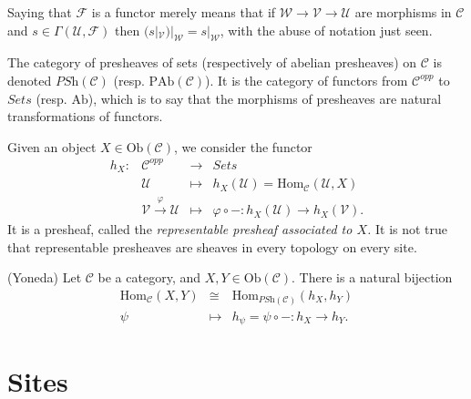 \medskip\noindent
Saying that $\mathcal{F}$ is a functor merely means that if $\mathcal{W} \to 
\mathcal{V} \to \mathcal{U}$ are morphisms in $\mathcal{C}$ and $s \in 
\Gamma(\mathcal{U},\mathcal{F})$ then
$(s|_\mathcal{V})|_\mathcal{W} = s |_\mathcal{W}$, with the abuse of
notation just seen.

\medskip\noindent
The category of presheaves of sets (respectively of abelian presheaves) on 
$\mathcal{C}$ is denoted $\textit{PSh} (\mathcal{C})$ (resp. $\text{PAb} 
(\mathcal{C})$). It is the category of functors from $\mathcal{C}^{opp}$ to 
$\textit{Sets}$ (resp. $\text{Ab}$), which is to say that the morphisms of 
presheaves are natural transformations of functors. 

\begin{example}
Given an object $X \in \text{Ob}(\mathcal{C})$, we consider the functor
$$
\begin{array}{rccl}
h_X : & \mathcal{C}^{opp} & \to & \textit{Sets} \\
& \mathcal{U} & \mapsto & h_X(\mathcal{U}) = \text{Hom}_\mathcal{C} 
(\mathcal{U},X) \\
& \mathcal{V}\xrightarrow{\varphi} \mathcal{U} & \mapsto & \varphi \circ  - : 
h_X(\mathcal{U}) \to h_X(\mathcal{V}).
\end{array}
$$
It is a presheaf, called the \emph{representable presheaf associated to $X$.} 
It is not true that representable presheaves are sheaves in every topology on 
every site.
\end{example}

\begin{lemma}
\label{lemma-yoneda}
(Yoneda)
Let $\mathcal{C}$ be a category, and $X,Y \in 
\text{Ob}(\mathcal{C})$. There is a natural bijection 
$$
\begin{array}{rcl}
\text{Hom}_\mathcal{C}(X,Y) & \cong & \text{Hom}_{\textit{PSh}(\mathcal{C})} 
(h_X,h_Y) \\
\psi & \longmapsto & h_\psi =  \psi \circ - : h_X \to h_Y.
\end{array}
$$
\end{lemma}

\section{Sites}
\label{section-sites}

